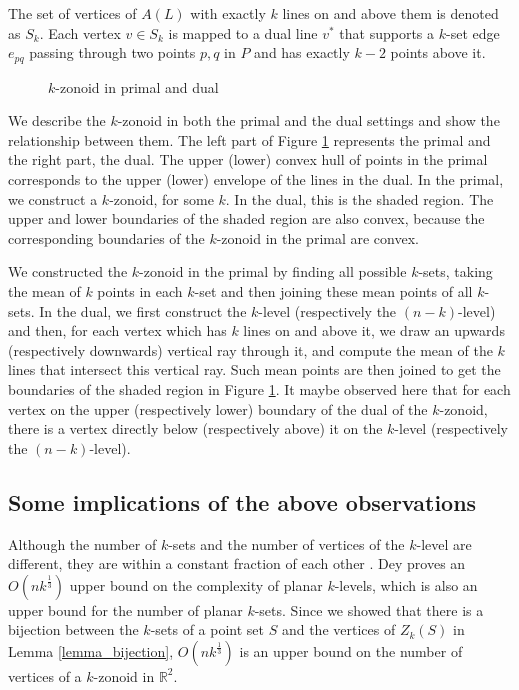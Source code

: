 \documentclass[charterfonts,lotsofwhite]{patmorin}
\begin{document}
The set of vertices of $A(L)$ with exactly $k$ lines on and above them is denoted as $S_k$. Each vertex $v \in S_k$ is mapped to a dual line $v^*$ that supports a $k$-set edge $e_{pq}$ passing through two points $p, q$ in $P$ and has exactly $k-2$ points above it.

\begin{figure}[h]
 \begin{center} 
   \caption{\label{fig_primal_dual}$k$-zonoid in primal and dual}
 \end{center}
\end{figure}

We describe the $k$-zonoid in both the primal and the dual settings and show the relationship between them. The left part of Figure \ref{fig_primal_dual} represents the primal and the right part, the dual. The upper (lower) convex hull of points in the primal corresponds to the upper (lower) envelope of the lines in the dual. In the primal, we construct a $k$-zonoid, for some $k$. In the dual, this is the shaded region. The upper and lower boundaries of the shaded region are also convex, because the corresponding boundaries of the $k$-zonoid in the primal are convex. 

We constructed the $k$-zonoid in the primal by finding all possible $k$-sets, taking the mean of $k$ points in each $k$-set and then joining these mean points of all $k$-sets. In the dual, we first construct the $k$-level (respectively the $(n-k)$-level) and then, for each vertex which has $k$ lines on and above it, we draw an upwards (respectively downwards) vertical ray through it, and compute the mean of the $k$ lines that intersect this vertical ray. Such mean points are then joined to get the boundaries of the shaded region in Figure \ref{fig_primal_dual}. It maybe observed here that for each vertex on the upper (respectively lower) boundary of the dual of the $k$-zonoid, there is a vertex directly below (respectively above) it on the $k$-level (respectively the $(n-k)$-level). 

\subsection{Some implications of the above observations}\label{subsection_some_implications_of_the_above_observations}

Although the number of $k$-sets and the number of vertices of the $k$-level are different, they are within a constant fraction of each other \cite{edelsbrunner_book}. Dey \cite{improved_bounds_on_planar_ksets_and_klevels} proves an $O(nk^{\frac{1}{3}})$ upper bound on the complexity of planar $k$-levels, which is also an upper bound for the number of planar $k$-sets. Since we showed that there is a bijection between the $k$-sets of a point set $S$ and the vertices of $Z_k(S)$ in Lemma \ref{lemma_bijection}, $O(nk^{\frac{1}{3}})$ is an upper bound on the number of vertices of a $k$-zonoid in $\mathbb{R}^2$.
\end{document}
